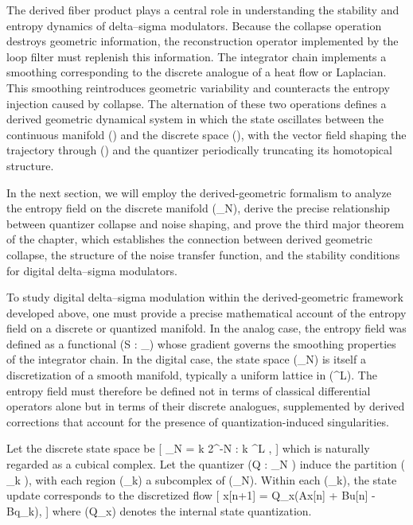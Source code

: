 The derived fiber product plays a central role in understanding the stability and entropy dynamics of delta--sigma modulators. Because the collapse operation destroys geometric information, the reconstruction operator implemented by the loop filter must replenish this information. The integrator chain implements a smoothing corresponding to the discrete analogue of a heat flow or Laplacian. This smoothing reintroduces geometric variability and counteracts the entropy injection caused by collapse. The alternation of these two operations defines a derived geometric dynamical system in which the state oscillates between the continuous manifold () and the discrete space (\Lambda), with the vector field shaping the trajectory through () and the quantizer periodically truncating its homotopical structure.

In the next section, we will employ the derived-geometric formalism to analyze the entropy field on the discrete manifold (_N), derive the precise relationship between quantizer collapse and noise shaping, and prove the third major theorem of the chapter, which establishes the connection between derived geometric collapse, the structure of the noise transfer function, and the stability conditions for digital delta--sigma modulators.

\noindent
To study digital delta--sigma modulation within the derived-geometric framework developed above, one must provide a precise mathematical account of the entropy field on a discrete or quantized manifold. In the analog case, the entropy field was defined as a functional (S :  \to {}_{}) whose gradient governs the smoothing properties of the integrator chain. In the digital case, the state space (_N) is itself a discretization of a smooth manifold, typically a uniform lattice in (^L). The entropy field must therefore be defined not in terms of classical differential operators alone but in terms of their discrete analogues, supplemented by derived corrections that account for the presence of quantization-induced singularities.

Let the discrete state space be
[
_N = { k 2^{-N} : k \in {}^L },
]
which is naturally regarded as a cubical complex. Let the quantizer (Q : _N \to \Lambda) induce the partition ( {\Omega_k} ), with each region (\Omega_k) a subcomplex of (_N). Within each (\Omega_k), the state update corresponds to the discretized flow
[
x[n+1] = Q_x(Ax[n] + Bu[n] - Bq_k),
]
where (Q_x) denotes the internal state quantization.

